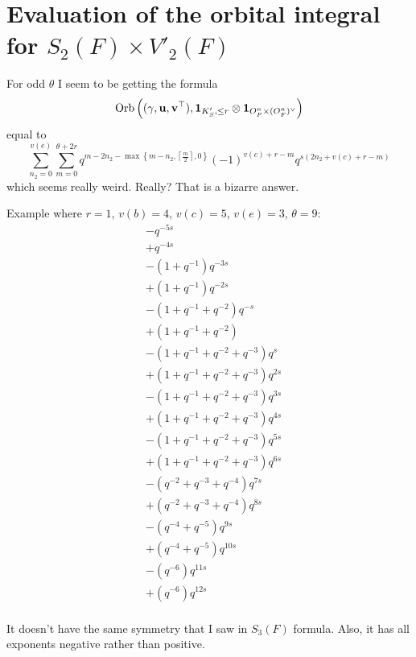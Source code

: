 \section{Evaluation of the orbital integral for $S_2(F) \times V'_2(F)$}
\label{sec:orbitalFJ2}

For odd $\theta$ I seem to be getting the formula
\[
  \operatorname{Orb}\left( (\gamma, \mathbf u, \mathbf v^\top), \mathbf{1}_{K'_S, \le r} \otimes \mathbf{1}_{O_F^n \times (O_F^n)^\vee} \right)
\]
equal to
\[
  \sum_{n_2=0}^{v(e)}
  \sum_{m=0}^{\theta + 2r}
  q^{m - 2n_2 - \max \left\{ m - n_2, \left\lceil \frac m2 \right\rceil, 0 \right\} }
  (-1)^{v(c) + r - m}
  q^{s(2n_2 + v(c) + r - m)}
\]
which seems really weird. Really?
That is a bizarre answer.

Example where $r = 1$, $v(b) = 4$, $v(c) = 5$, $v(e) = 3$, $\theta = 9$:
\begin{align*}
  &- q^{-5s} \\
  &+ q^{-4s} \\
  &- \left( 1 + q^{-1} \right) q^{-3s} \\
  &+ \left( 1 + q^{-1} \right) q^{-2s} \\
  &- \left( 1 + q^{-1} + q^{-2} \right) q^{-s} \\
  &+ \left( 1 + q^{-1} + q^{-2} \right) \\
  &- \left( 1 + q^{-1} + q^{-2} + q^{-3} \right) q^{s} \\
  &+ \left( 1 + q^{-1} + q^{-2} + q^{-3} \right) q^{2s} \\
  &- \left( 1 + q^{-1} + q^{-2} + q^{-3} \right) q^{3s} \\
  &+ \left( 1 + q^{-1} + q^{-2} + q^{-3} \right) q^{4s} \\
  &- \left( 1 + q^{-1} + q^{-2} + q^{-3} \right) q^{5s} \\
  &+ \left( 1 + q^{-1} + q^{-2} + q^{-3} \right) q^{6s} \\
  &- \left( q^{-2} + q^{-3} + q^{-4} \right) q^{7s} \\
  &+ \left( q^{-2} + q^{-3} + q^{-4} \right) q^{8s} \\
  &- \left( q^{-4} + q^{-5} \right) q^{9s} \\
  &+ \left( q^{-4} + q^{-5} \right) q^{10s} \\
  &- \left( q^{-6} \right) q^{11s} \\
  &+ \left( q^{-6} \right) q^{12s} \\
\end{align*}

It doesn't have the same symmetry that I saw in $S_3(F)$ formula.
Also, it has all exponents negative rather than positive.
